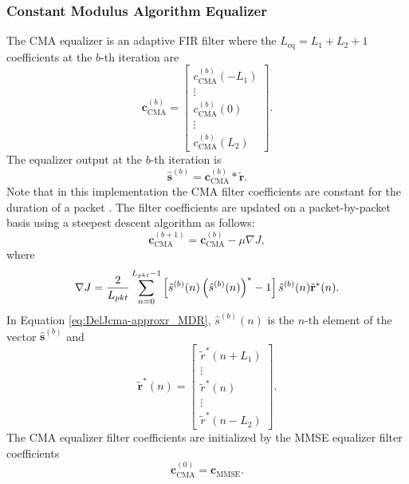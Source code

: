\subsubsection{Constant Modulus Algorithm Equalizer}
The CMA equalizer is an adaptive FIR filter where the $L_\text{eq}=L_1+L_2+1$ coefficients at the $b$-th iteration are
\begin{equation}
\mathbf{c}_\text{CMA}^{(b)} = 
\begin{bmatrix}
c_\text{CMA}^{(b)}(-L_1) \\ \vdots \\ c_\text{CMA}^{(b)}(0) \\ \vdots \\ c_\text{CMA}^{(b)}(L_2)
\end{bmatrix}.
\end{equation}
The equalizer output at the $b$-th iteration is 
\begin{equation}
\hat{\mathbf{s}}^{(b)} = 
\mathbf{c}_\text{CMA}^{(b)} \ast \tilde{\mathbf{r}}.
\end{equation}
Note that in this implementation the CMA filter coefficients are constant for the duration of a packet \cite{rice-afran-saquib-cole-rhodes-moazzami:2014}.
The filter coefficients are updated on a packet-by-packet basis using a steepest descent algorithm as follows:
\begin{equation}
\mathbf{c}_\text{CMA}^{(b+1)} = \mathbf{c}_\text{CMA}^{(b)}-\mu \nabla J,
\label{eq:steepest}
\end{equation}
where
\begin{equation}
	\nabla J = \frac{2}{L_{pkt}} \sum_{n=0}^{L_{pkt}-1}
	\left[ \vphantom{\displaystyle\sum}  \hat{s}^{(b)}(n) \left( \hat{s}^{(b)}(n)\right)^\ast - 1 \right]
	\hat{s}^{(b)}(n)  \tilde{\mathbf{r}}^\ast(n).
\label{eq:DelJcma-approxr_MDR}
\end{equation}
In Equation \eqref{eq:DelJcma-approxr_MDR}, $\hat{s}^{(b)}(n)$ is the $n$-th element of the vector $\hat{\mathbf{s}}^{(b)}$ and
\begin{equation}
\tilde{\mathbf{r}}^\ast(n) = \begin{bmatrix} \tilde{r}^\ast(n+L_1) \\ \vdots \\ \tilde{r}^\ast(n) \\ \vdots \\ \tilde{r}^\ast(n-L_2) \end{bmatrix}.
\label{eq:r_tilde_n}
\end{equation}
The CMA equalizer filter coefficients are initialized by the MMSE equalizer filter coefficients
\begin{equation}
\mathbf{c}_\text{CMA}^{(0)} = \mathbf{c}_\text{MMSE}.
\label{eq:CMA_init}
\end{equation}

